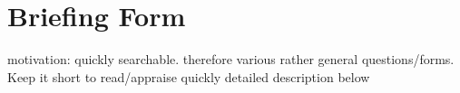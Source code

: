 \section{Briefing Form}
motivation: quickly searchable. therefore various rather general questions/forms. Keep it short to read/appraise quickly detailed description below